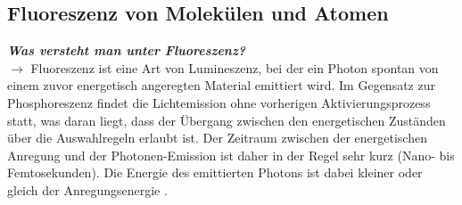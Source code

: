 \subsection{\label{subsec:FZV1}Fluoreszenz von Molekülen und Atomen}
\textbf{\textit{Was versteht man unter Fluoreszenz?}} \\
$\rightarrow$
Fluoreszenz ist eine Art von Lumineszenz, bei der ein Photon spontan von einem zuvor
energetisch angeregten Material emittiert wird.
Im Gegensatz zur Phosphoreszenz findet die Lichtemission ohne vorherigen
Aktivierungsprozess statt, was daran liegt, dass der Übergang zwischen den
energetischen Zuständen über die Auswahlregeln erlaubt ist.
Der Zeitraum zwischen der energetischen Anregung und der Photonen-Emission
ist daher in der Regel sehr kurz (Nano- bis Femtosekunden).
Die Energie des emittierten Photons ist dabei kleiner oder gleich der
Anregungsenergie \cite{EPC, AMO, Demtroder, Prinzip}. \\

